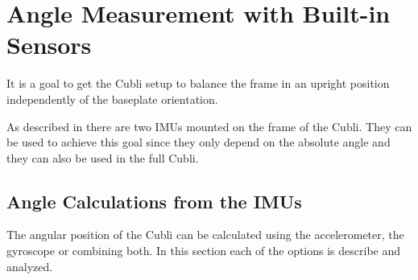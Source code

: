 \chapter{Angle Measurement with Built-in Sensors}\label{chap:CompFilter}
It is a goal to get the Cubli setup to balance the frame in an upright position independently of the baseplate orientation.

As described in  there are two IMUs mounted on the frame of the Cubli. They can be used to achieve this goal since they only depend on the absolute angle and they can also be used in the full Cubli.

\section{Angle Calculations from the IMUs}
The angular position of the Cubli can be calculated using the accelerometer, the gyroscope or combining both. In this section each of the options is describe and analyzed.

